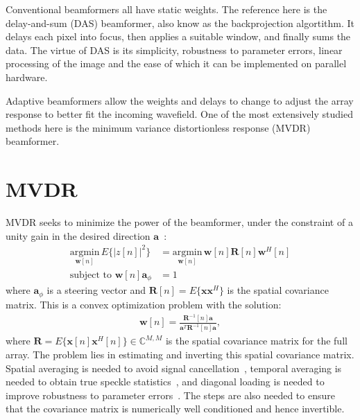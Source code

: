 \documentclass[10pt,journal,draftclsnofoot,onecolumn]{IEEEtran}
\newcommand\argmin[1]{\text{arg}\;\underset{#1}{\text{min}}}
\newcommand\T{^{\scriptscriptstyle T}}
\renewcommand\H{^{\scriptscriptstyle H}}
\renewcommand\vec[1]{\boldsymbol{#1}}
\newcommand\mat[1]{\boldsymbol{#1}}
\newcommand\1{\vec 1}
\renewcommand*\a{\vec a}
\newcommand*\w{\vec w}
\newcommand*\x{\vec x}
\newcommand*\R{\mat R}
\newcommand*\Ri{\R^{-1}}
\renewcommand\argmin{\text{argmin}}
\begin{document}
Conventional beamformers all have static weights. The reference here is the delay-and-sum (DAS) beamformer, also know as the backprojection algortithm. It delays each pixel into focus, then applies a suitable window, and finally sums the data. The virtue of DAS is its simplicity, robustness to parameter errors, linear processing of the image and the ease of which it can be implemented on parallel hardware.

Adaptive beamformers allow the weights and delays to change to adjust the array response to better fit the incoming wavefield. One of the most extensively studied methods here is the minimum variance distortionless response (MVDR) beamformer.

\section{MVDR}

MVDR seeks to minimize the power of the beamformer, under the constraint of a unity gain in the desired direction $\a$~\cite{Capon1969}:
%
\begin{align}
\underset{\w[n]}{\argmin}\, E\{|z[n]|^2\} &= \underset{\w[n]}{\argmin}\, \w[n]\R[n]\w\H[n]\\
\text{subject to } \w[n]\a_\phi &= 1
\end{align}
%
where $\a_\phi$ is a steering vector and $\R[n] = E\{\x\x\H\}$ is the spatial covariance matrix. This is a convex optimization problem with the solution:
%
\begin{gather}
\vec w[n] = \frac{\Ri[n]\a}{\a\T\Ri[n]\a},\label{weights}
\end{gather}
where $\R=E\{\x[n]\x\H[n]\}\in\mathbb{C}^{M,M}$ is the spatial covariance matrix for the full array. The problem lies in estimating and inverting this spatial covariance matrix. Spatial averaging is needed to avoid signal cancellation~\cite{Kailath1985}, temporal averaging is needed to obtain true speckle statistics~\cite{Synnevag2009a}, and diagonal loading is needed to improve robustness to parameter errors~\cite{Cox1987,Maksym1979}. The steps are also needed to ensure that the covariance matrix is numerically well conditioned and hence invertible.
\end{document}
